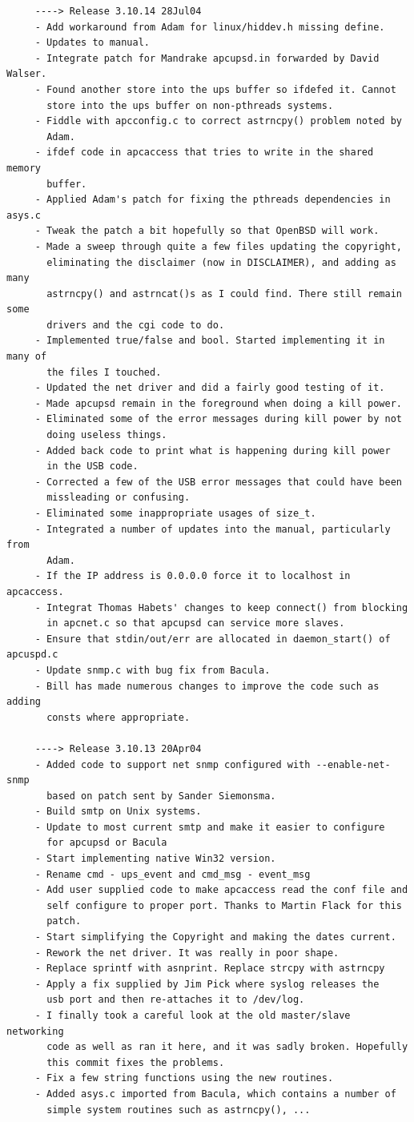 \begin{verbatim}
     ----> Release 3.10.14 28Jul04
     - Add workaround from Adam for linux/hiddev.h missing define.
     - Updates to manual.
     - Integrate patch for Mandrake apcupsd.in forwarded by David Walser.
     - Found another store into the ups buffer so ifdefed it. Cannot
       store into the ups buffer on non-pthreads systems.
     - Fiddle with apcconfig.c to correct astrncpy() problem noted by
       Adam.
     - ifdef code in apcaccess that tries to write in the shared memory
       buffer.
     - Applied Adam's patch for fixing the pthreads dependencies in asys.c
     - Tweak the patch a bit hopefully so that OpenBSD will work.
     - Made a sweep through quite a few files updating the copyright,
       eliminating the disclaimer (now in DISCLAIMER), and adding as many
       astrncpy() and astrncat()s as I could find. There still remain some
       drivers and the cgi code to do.
     - Implemented true/false and bool. Started implementing it in many of
       the files I touched.
     - Updated the net driver and did a fairly good testing of it.
     - Made apcupsd remain in the foreground when doing a kill power.
     - Eliminated some of the error messages during kill power by not
       doing useless things.
     - Added back code to print what is happening during kill power
       in the USB code.
     - Corrected a few of the USB error messages that could have been
       missleading or confusing.
     - Eliminated some inappropriate usages of size_t.
     - Integrated a number of updates into the manual, particularly from
       Adam.
     - If the IP address is 0.0.0.0 force it to localhost in apcaccess.
     - Integrat Thomas Habets' changes to keep connect() from blocking
       in apcnet.c so that apcupsd can service more slaves.
     - Ensure that stdin/out/err are allocated in daemon_start() of apcuspd.c
     - Update snmp.c with bug fix from Bacula.
     - Bill has made numerous changes to improve the code such as adding
       consts where appropriate.
     
     ----> Release 3.10.13 20Apr04
     - Added code to support net snmp configured with --enable-net-snmp
       based on patch sent by Sander Siemonsma.
     - Build smtp on Unix systems.
     - Update to most current smtp and make it easier to configure
       for apcupsd or Bacula
     - Start implementing native Win32 version.
     - Rename cmd - ups_event and cmd_msg - event_msg
     - Add user supplied code to make apcaccess read the conf file and
       self configure to proper port. Thanks to Martin Flack for this
       patch.
     - Start simplifying the Copyright and making the dates current.
     - Rework the net driver. It was really in poor shape.
     - Replace sprintf with asnprint. Replace strcpy with astrncpy
     - Apply a fix supplied by Jim Pick where syslog releases the
       usb port and then re-attaches it to /dev/log.
     - I finally took a careful look at the old master/slave networking
       code as well as ran it here, and it was sadly broken. Hopefully
       this commit fixes the problems.
     - Fix a few string functions using the new routines.
     - Added asys.c imported from Bacula, which contains a number of
       simple system routines such as astrncpy(), ...
     
\end{verbatim}
